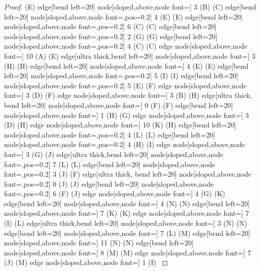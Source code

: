 \begin{proof}
{(E) edge[bend left=20]  node[sloped,above,node font=\tiny] {3} (B)
(C) edge[bend left=20]
 node[sloped,above,node font=\tiny,pos=0.2] {4} (E)
(E) edge[bend left=20]  node[sloped,above,node font=\tiny,pos=0.2] {6} (C)
(C) edge[bend left=20]
 node[sloped,above,node font=\tiny,pos=0.2] {2} (G)
(G) edge[bend left=20]  node[sloped,above,node font=\tiny,pos=0.2] {4} (C)
(C) edge node[sloped,above,node font=\tiny] {10} (A)
(E) edge[ultra thick,bend left=20]
 node[sloped,above,node font=\tiny] {3} (H)
(H) edge[bend left=20]  node[sloped,above,node font=\tiny] {4} (E)
(E) edge[bend left=20]
 node[sloped,above,node font=\tiny,pos=0.2] {5} (I)
(I) edge[bend left=20]  node[sloped,above,node font=\tiny,pos=0.2] {5} (E)
(F) edge node[sloped,above,node font=\tiny] {3} (D)
(F) edge node[sloped,above,node font=\tiny] {3} (B)
(H) edge[ultra thick, bend left=20]  node[sloped,above,node font=\tiny] {0} (F)
(F) edge[bend left=20]  node[sloped,above,node font=\tiny] {1} (H)
(G) edge node[sloped,above,node font=\tiny] {3} (D)
(H) edge node[sloped,above,node font=\tiny] {10} (K)
(H) edge[bend left=20]
 node[sloped,above,node font=\tiny,pos=0.2] {4} (L)
(L) edge[bend left=20]  node[sloped,above,node font=\tiny,pos=0.2] {4} (H)
(I) edge node[sloped,above,node font=\tiny] {3} (G)
(J) edge[ultra thick,bend left=20]
 node[sloped,above,node font=\tiny,pos=0.2] {7} (L)
(L) edge[bend left=20]  node[sloped,above,node font=\tiny,pos=0.2] {3} (J)
(F) edge[ultra thick, bend left=20]  node[sloped,above,node font=\tiny,pos=0.2] {0} (J)
(J) edge[bend left=20]  node[sloped,above,node font=\tiny,pos=0.2] {6} (F)
(J) edge node[sloped,above,node font=\tiny] {4} (G)
(K) edge[bend left=20]
 node[sloped,above,node font=\tiny] {4} (N)
(N) edge[bend left=20]  node[sloped,above,node font=\tiny] {7} (K)
(K) edge node[sloped,above,node font=\tiny] {7} (I)
(L) edge[ultra thick,bend left=20]
 node[sloped,above,node font=\tiny] {3} (N)
(N) edge[bend left=20]  node[sloped,above,node font=\tiny] {7} (L)
(M) edge[bend left=20]
 node[sloped,above,node font=\tiny] {11} (N)
(N) edge[bend left=20]  node[sloped,above,node font=\tiny] {8} (M)
(M) edge node[sloped,above,node font=\tiny] {7} (J)
(M) edge node[sloped,above,node font=\tiny] {1} (I)
}
\usetikzlibrary{graphs,automata,positioning}
\end{proof}
